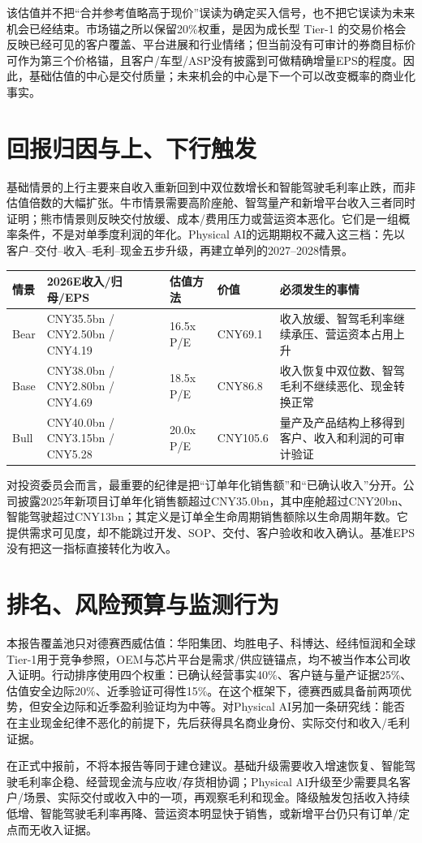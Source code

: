 该估值并不把“合并参考值略高于现价”误读为确定买入信号，也不把它误读为未来机会已经结束。市场锚之所以保留20\%权重，是因为成长型 Tier-1 的交易价格会反映已经可见的客户覆盖、平台进展和行业情绪；但当前没有可审计的券商目标价可作为第三个价格锚，且客户/车型/ASP没有披露到可做精确增量EPS的程度。因此，基础估值的中心是交付质量；未来机会的中心是下一个可以改变概率的商业化事实。

\section{回报归因与上、下行触发}

基础情景的上行主要来自收入重新回到中双位数增长和智能驾驶毛利率止跌，而非估值倍数的大幅扩张。牛市情景需要高阶座舱、智驾量产和新增平台收入三者同时证明；熊市情景则反映交付放缓、成本/费用压力或营运资本恶化。它们是一组概率条件，不是对单季度利润的年化。Physical AI的远期期权不藏入这三档：先以客户--交付--收入--毛利--现金五步升级，再建立单列的2027--2028情景。

\begin{exhibitbox}[三档价值与验证条件]
\small
\begin{tabularx}{\textwidth}{L{1.8cm}Y Y Y Y}
\toprule
情景 & 2026E收入/归母/EPS & 估值方法 & 价值 & 必须发生的事情 \\
\midrule
Bear & CNY35.5bn / CNY2.50bn / CNY4.19 & 16.5x P/E & CNY69.1 & 收入放缓、智驾毛利率继续承压、营运资本占用上升 \\
Base & CNY38.0bn / CNY2.80bn / CNY4.69 & 18.5x P/E & CNY86.8 & 收入恢复中双位数、智驾毛利不继续恶化、现金转换正常 \\
Bull & CNY40.0bn / CNY3.15bn / CNY5.28 & 20.0x P/E & CNY105.6 & 量产及产品结构上移得到客户、收入和利润的可审计验证 \\
\bottomrule
\end{tabularx}
\end{exhibitbox}

对投资委员会而言，最重要的纪律是把“订单年化销售额”和“已确认收入”分开。公司披露2025年新项目订单年化销售额超过CNY35.0bn，其中座舱超过CNY20bn、智能驾驶超过CNY13bn；其定义是订单全生命周期销售额除以生命周期年数。它提供需求可见度，却不能跳过开发、SOP、交付、客户验收和收入确认。基准EPS没有把这一指标直接转化为收入。

\section{排名、风险预算与监测行为}

本报告覆盖池只对德赛西威估值：华阳集团、均胜电子、科博达、经纬恒润和全球Tier-1用于竞争参照，OEM与芯片平台是需求/供应链锚点，均不被当作本公司收入证明。行动排序使用四个权重：已确认经营事实40\%、客户链与量产证据25\%、估值安全边际20\%、近季验证可得性15\%。在这个框架下，德赛西威具备前两项优势，但安全边际和近季盈利验证均为中等。对Physical AI另加一条研究线：能否在主业现金纪律不恶化的前提下，先后获得具名商业身份、实际交付和收入/毛利证据。

\begin{riskbox}[监测纪律]
在正式中报前，不将本报告等同于建仓建议。基础升级需要收入增速恢复、智能驾驶毛利率企稳、经营现金流与应收/存货相协调；Physical AI升级至少需要具名客户/场景、实际交付或收入中的一项，再观察毛利和现金。降级触发包括收入持续低增、智能驾驶毛利率再降、营运资本明显快于销售，或新增平台仍只有订单/定点而无收入证据。
\end{riskbox}
